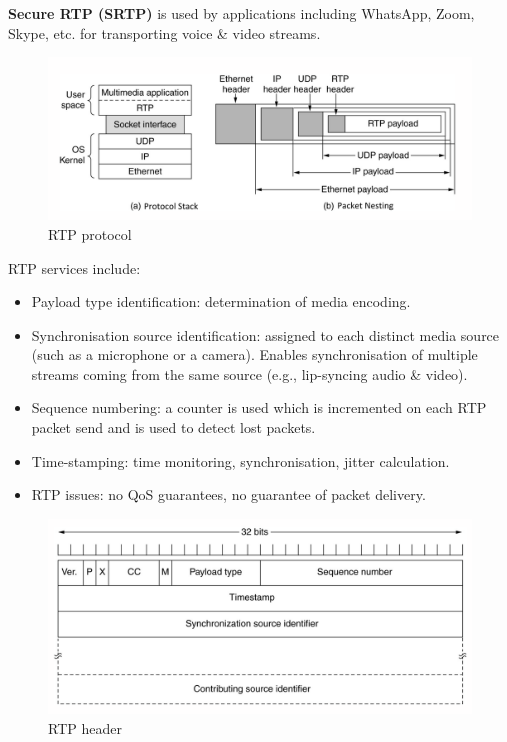 \documentclass[a4paper,11pt]{article}
\begin{document}
\textbf{Secure RTP (SRTP)} is used by applications including WhatsApp, Zoom, Skype, etc. for transporting voice \& video streams.

\begin{figure}[H]
    \centering
    \includegraphics[width=\textwidth]{./images/RTP.png}
    \caption{ RTP protocol}
\end{figure}

RTP services include:
\begin{itemize}
    \item   Payload type identification: determination of media encoding.
    \item   Synchronisation source identification: assigned to each distinct media source (such as a microphone or a camera).
            Enables synchronisation of multiple streams coming from the same source (e.g., lip-syncing audio \& video).
    \item   Sequence numbering: a counter is used which is incremented on each RTP packet send and is used to detect lost packets.
    \item   Time-stamping: time monitoring, synchronisation, jitter calculation.
    \item   RTP issues: no QoS guarantees, no guarantee of packet delivery.
\end{itemize}

\begin{figure}[H]
    \centering
    \includegraphics[width=\textwidth]{./images/RTPpheader.png}
    \caption{ RTP header}
\end{figure}
\end{document}
